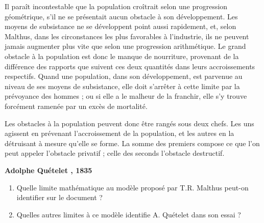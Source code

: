 \documentclass[oneside,12pt]{article}          %
\begin{document}
\begin{tcolorbox}[
    enhanced , arc = 0pt , top = 4mm ,
    colback = white ,
    fonttitle = \bfseries , title = {Document \no 4 : Extrait de \og Essai de physique sociale \fg} , boxed title style = {arc = 0pt} ,
    coltitle = black , colbacktitle = black!10 ,
    attach boxed title to top left = {xshift = 5mm , yshift = -4mm} ,
	]	

	{\ttfamily\itshape\restoreskip
	
	Il paraît incontestable que la population croîtrait selon une progression géométrique, s’il ne se présentait aucun obstacle à son développement. Les moyens de subsistance ne se développent point aussi rapidement, et, selon Malthus, dans les circonstances les plus 	favorables à l’industrie, ils ne peuvent jamais augmenter plus vite que selon une progression arithmétique. Le grand obstacle à la population est donc le manque de nourriture, provenant de la différence des rapports que suivent ces deux quantités dans leurs accroissements respectifs. Quand une population, dans son développement, est parvenue au niveau de ses 	moyens de subsistance, elle doit s’arrêter à cette limite par la prévoyance des hommes ; ou si elle a le malheur de la franchir, elle s’y trouve forcément ramenée par un excès de mortalité.
	
	Les obstacles à la population peuvent donc être rangés sous deux chefs. Les uns agissent en prévenant l’accroissement de la population, et les autres en la détruisant à mesure qu'elle se forme. La somme des premiers compose ce que l’on peut appeler l’obstacle privatif ; celle des seconds l’obstacle destructif.
	}
	\begin{flushright}
	    \textbf{Adolphe Quételet , 1835}
	\end{flushright}
\end{tcolorbox}


\begin{tcolorbox}[
    enhanced , arc = 3pt , top = 4mm ,
    fonttitle = \bfseries , title = Questions sur les documents \no 3 \& \no 4  , boxed title style = {arc = 3pt} ,
    coltitle = black , colbacktitle = white ,
    attach boxed title to top left = {xshift = 5mm , yshift = -4mm} ,
	]

	\begin{enumerate}
		\item Quelle limite mathématique au modèle proposé par T.R. Malthus peut-on identifier sur le document  ?
		\item Quelles autres limites à ce modèle identifie A. Quételet dans son essai ?
	\end{enumerate}
\end{tcolorbox}
\end{document}
